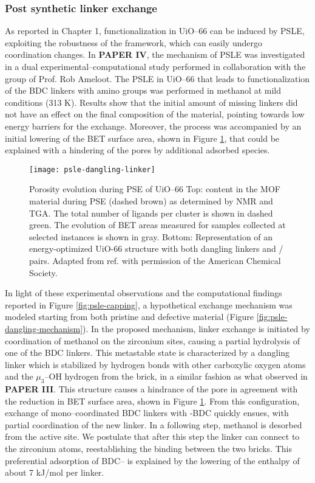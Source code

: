\subsubsection*{Post synthetic linker exchange}
As reported in Chapter 1, functionalization in UiO--66 can be induced by PSLE, exploiting the robustness of the framework, which can easily undergo coordination changes. In \textbf{PAPER IV}, the mechanism of PSLE was investigated in a dual experimental--computational study performed in collaboration with the group of Prof. Rob Ameloot. The PSLE in UiO--66 that leads to functionalization of the BDC linkers with amino groups was performed in methanol at mild conditions (313 K). Results show that the initial amount of missing linkers did not have an effect on the final composition of the material, pointing towards low energy barriers for the exchange. Moreover, the process was accompanied by an initial lowering of the BET surface area, shown in Figure \ref{fig:psle-dangling-linker}, that could be explained with a hindering of the pores by additional adsorbed species. 
\npar
\begin{figure}[!htbp]
	\centering
	\texttt{[image: psle-dangling-linker]}
	\caption{Porosity evolution during PSE of UiO--66 Top:  content in the MOF material during PSE (dashed brown) as determined by NMR and TGA. The total number of ligands per cluster is shown in dashed green. The evolution of BET areas measured for samples collected at selected instances is shown in gray. Bottom: Representation of an energy-optimized UiO-66 structure with both dangling linkers and / pairs. Adapted from ref. \cite{marreiros2019active} with permission of the American Chemical Society.}
	\label{fig:psle-dangling-linker}
\end{figure}
In light of these experimental observations and the computational findings reported in Figure \ref{fig:psle-capping}, a hypothetical exchange mechanism was modeled starting from both pristine and defective material (Figure \ref{fig:psle-dangling-mechanism}). In the proposed mechanism, linker exchange is initiated by coordination of methanol on the zirconium sites, causing a partial hydrolysis of one of the BDC linkers. This metastable state is characterized by a dangling linker which is stabilized by hydrogen bonds with other carboxylic oxygen atoms and the $\mu_3$--OH hydrogen from the brick, in a similar fashion as what observed in \textbf{PAPER III}. This structure causes a hindrance of the pore in agreement with the reduction in BET surface area, shown in Figure \ref{fig:psle-dangling-linker}. From this configuration, exchange of mono--coordinated BDC linkers with -BDC quickly ensues, with partial coordination of the new linker. In a following step, methanol is desorbed from the active site. We postulate that after this step the linker can connect to the zirconium atoms, reestablishing the binding between the two bricks. This preferential adsorption of BDC-- is explained by the lowering of the enthalpy of about 7 kJ/mol per linker. 

